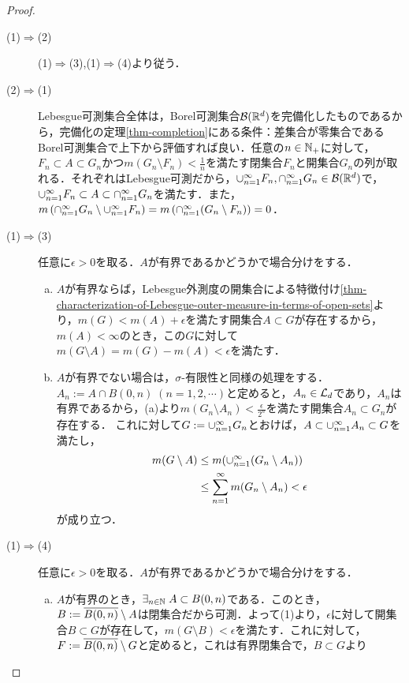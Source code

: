 \documentclass[uplatex, dvipdfmx]{jsreport}
\begin{document}
\begin{proof}\mbox{}
    \begin{description}
        \item[(1)$\Rightarrow$(2)] (1)$\Rightarrow$(3),(1)$\Rightarrow$(4)より従う．
        \item[(2)$\Rightarrow$(1)] Lebesgue可測集合全体は，Borel可測集合$\mathcal{B}(\mathbb{R}^d)$を完備化したものであるから，完備化の定理\ref{thm-completion}にある条件：差集合が零集合であるBorel可測集合で上下から評価すれば良い．任意の$n\in\mathbb{N}_+$に対して，$F_n\subset A\subset G_n$かつ$m(G_n\setminus F_n)<\frac{1}{n}$を満たす閉集合$F_n$と開集合$G_n$の列が取れる．それぞれはLebesgue可測だから，$\cup_{n=1}^\infty F_n,\cap_{n=1}^\infty G_n\in\mathcal{B}(\mathbb{R}^d)$で，
        $\cup_{n=1}^\infty F_n\subset A\subset\cap_{n=1}^\infty G_n$を満たす．また，$m\left(\cap_{n=1}^\infty G_n\setminus\cup_{n=1}^\infty F_n\right)=m\left(\cap_{n=1}^\infty(G_n\setminus F_n)\right)=0$．
        \item[(1)$\Rightarrow$(3)] 任意に$\epsilon>0$を取る．$A$が有界であるかどうかで場合分けをする．
        \begin{enumerate}[(a)]
            \item $A$が有界ならば，Lebesgue外測度の開集合による特徴付け\ref{thm-characterization-of-Lebesgue-outer-measure-in-terms-of-open-sets}より，$m(G)<m(A)+\epsilon$を満たす開集合$A\subset G$が存在するから，
            $m(A)<\infty$のとき，この$G$に対して$m(G\setminus A)=m(G)-m(A)<\epsilon$を満たす．
            \item $A$が有界でない場合は，$\sigma$-有限性と同様の処理をする．$A_n:=A\cap B(0,n)\;(n=1,2,\cdots)$と定めると，$A_n\in\mathcal{L}_d$であり，$A_n$は有界であるから，(a)より$m(G_n\setminus A_n)<\frac{\epsilon}{2^n}$を満たす開集合$A_n\subset G_n$が存在する．
            これに対して$G:=\cup_{n=1}^\infty G_n$とおけば，$A\subset\cup_{n=1}^\infty A_n\subset G$を満たし，
            \begin{align*}
                m(G\setminus A)&\le m(\cup_{n=1}^\infty(G_n\setminus A_n))\\
                &\le\sum_{n=1}^\infty m(G_n\setminus A_n)<\epsilon
            \end{align*}
            が成り立つ．
        \end{enumerate}
        \item[(1)$\Rightarrow$(4)] 任意に$\epsilon>0$を取る．$A$が有界であるかどうかで場合分けをする．
        \begin{enumerate}[(a)]
            \item $A$が有界のとき，$\exists_{n\in\mathbb{N}}\;A\subset B(0,n)$である．このとき，$B:=\overline{B(0,n)}\setminus A$は閉集合だから可測．よって(1)より，$\epsilon$に対して開集合$B\subset G$が存在して，$m(G\setminus B)<\epsilon$を満たす．これに対して，$F:=\overline{B(0,n)}\setminus G$と定めると，これは有界閉集合で，$B\subset G$より

\end{enumerate}
\end{description}
\end{proof}
\end{document}
